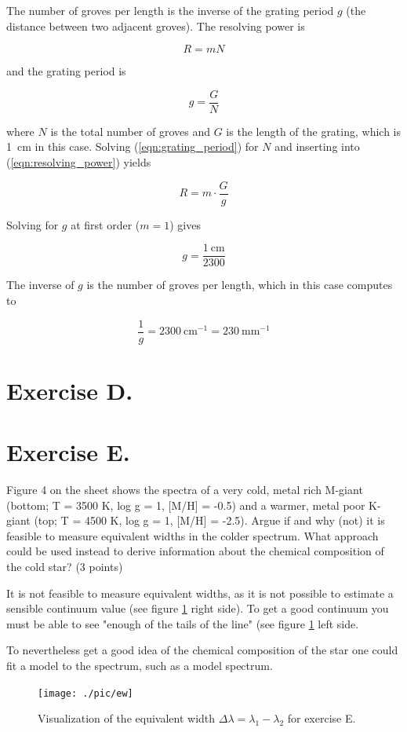\documentclass[11pt,a4paper,twoside]{article}
\begin{document}
The number of groves per length is the inverse of the grating period $g$ (the distance between two adjacent groves). The resolving power is 

\begin{equation}
 R = m N
 \label{eqn:resolving_power}
\end{equation}

and the grating period is 

\begin{equation}
 g = \frac{G}{N}
 \label{eqn:grating_period}
\end{equation}

where $N$ is the total number of groves and $G$ is the length of the grating, which is \SI{1}{\cm} in this case. Solving (\ref{eqn:grating_period}) for $N$ and inserting into (\ref{eqn:resolving_power}) yields 

\begin{equation}
 R = m \cdot \frac{G}{g}
\end{equation}

Solving for $g$ at first order ($m = 1$) gives 

\begin{equation}
 g = \frac{\SI{1}{\cm}}{2300}
\end{equation}

The inverse of $g$ is the number of groves per length, which in this case computes to 

\begin{equation}
 \frac{1}{g} = \SI{2300}{\cm^{-1}} = \SI{230}{\mm^{-1}}
\end{equation}

\section*{Exercise D.}
\section*{Exercise E.}

Figure 4 on the sheet shows the spectra of a very cold, metal rich M-giant 
(bottom; T = 3500 K, log g = 1, [M/H] = -0.5) and a warmer, metal poor K-giant 
(top; T = 4500 K, log g = 1, [M/H] = -2.5). Argue if and why (not) it is 
feasible to measure equivalent widths in the colder spectrum. What approach 
could be used instead to derive information about the chemical composition of 
the cold star? (3 points)
\newline

It is not feasible to measure equivalent widths, as it is not possible to 
estimate a sensible continuum value (see figure \ref{fig:ew} right side). To
get a good continuum you must be able to see "enough of the tails of the 
line" (see figure \ref{fig:ew} left side.

To nevertheless get a good idea of the chemical composition of the star one 
could fit a model to the spectrum, such as a model spectrum.

\begin{figure}
\centering
\texttt{[image: ./pic/ew]}
\caption{Visualization of the equivalent width $\Delta\lambda = 
\lambda_1 - \lambda_2$ for exercise E.}
\label{fig:ew}
\end{figure}
\end{document}
